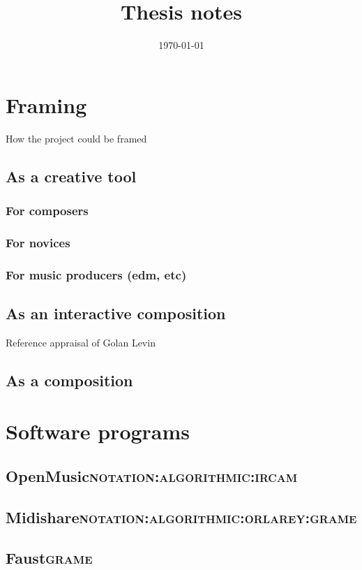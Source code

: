 \documentclass[11pt]{article}
\date{\today}
\title{Thesis notes}
\begin{document}
\maketitle

\section{Framing}
\label{sec:org1e71ba7}
How the project could be framed
\subsection{As a creative tool}
\label{sec:org592e895}
\subsubsection{For composers}
\label{sec:org34fa9a3}
\subsubsection{For novices}
\label{sec:orgf238ae3}
\subsubsection{For music producers (edm, etc)}
\label{sec:org34b6665}
\subsection{As an interactive composition}
\label{sec:orgb6b2ca6}
Reference appraisal of Golan Levin
\subsection{As a composition}
\label{sec:org1021683}

\section{Software programs}
\label{sec:org66b2781}
\subsection{OpenMusic\hfill{}\textsc{notation:algorithmic:ircam}}
\label{sec:orgd65eb2c}
\subsection{Midishare\hfill{}\textsc{notation:algorithmic:orlarey:grame}}
\label{sec:org0d4ba51}
\subsection{Faust\hfill{}\textsc{grame}}
\label{sec:orgea41ad6}
\end{document}
